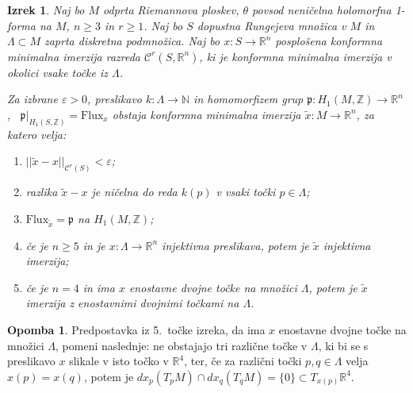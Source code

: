 \documentclass[12pt,a4paper,twoside]{article}
\theoremstyle{definition} %
\newtheorem{opomba}[definicija]{Opomba}
\theoremstyle{plain} %
\newtheorem{izrek}[definicija]{Izrek}
\numberwithin{equation}{section}  %
\newcommand{\R}{\mathbb R}
\newcommand{\N}{\mathbb N}
\newcommand{\Z}{\mathbb Z}
\begin{document}
\begin{izrek} \label{izr:glavni-izrek-CMI}
Naj bo $M$ odprta Riemannova ploskev, $\theta$ povsod neničelna holomorfna 1-forma na $M$, $n \geq 3$ in $r \geq 1$.
Naj bo $S$ dopustna Rungejeva množica v $M$ in $\Lambda \subset M$ zaprta diskretna podmnožica. 
Naj bo $x \colon S \to \R^{n}$ posplošena konformna minimalna imerzija razreda $\mathcal{C}^{r}(S, \R^{n})$, ki je konformna minimalna imerzija v okolici vsake točke iz $\Lambda$.

Za izbrane $\varepsilon > 0$, preslikavo $k \colon \Lambda \to \N$ in homomorfizem grup $\mathfrak{p} \colon H_{1}(M,\Z) \to \R^{n}$, \ $\mathfrak{p}|_{H_{1}(S,\Z)} = \mathrm{Flux}_{x}$ obstaja konformna minimalna imerzija $\tilde{x} \colon M \to \R^{n}$, za katero velja:
\begin{enumerate}
\item $||\tilde{x} - x||_{\mathcal{C}^{r}(S)} < \varepsilon$;
\item razlika $\tilde{x}-x$ je ničelna do reda $k(p)$ v vsaki točki $p\in \Lambda$;
\item $\mathrm{Flux}_{\tilde{x}} = \mathfrak{p}$ na $H_{1}(M,\Z)$;
\item če je $n\geq5$ in je $x \colon \Lambda \to \R^{n}$ injektivna preslikava, potem je $\tilde{x}$ injektivna imerzija;
\item če je $n=4$ in ima $x$ enostavne dvojne točke na množici $\Lambda$, potem je $\tilde{x}$ imerzija z enostavnimi dvojnimi točkami na $\Lambda$.
\end{enumerate}
\end{izrek}

\begin{opomba}
Predpostavka iz 5.~točke izreka, da ima $x$ enostavne dvojne točke na množici $\Lambda$, pomeni naslednje:
ne obstajajo tri različne točke v $\Lambda$, ki bi se s preslikavo $x$ slikale v isto točko v $\mathbb{R}^{4}$, ter, če za različni točki $p, q \in \Lambda$ velja $x(p) = x(q)$, potem je $dx_{p}(T_{p}M) \cap dx_{q}(T_{q}M) = \{ 0 \} \subset T_{x(p)}\mathbb{R}^{4}$.
\end{opomba}
\end{document}

